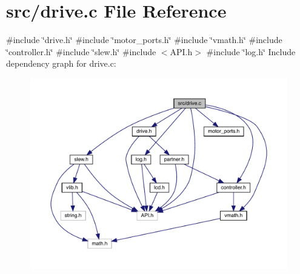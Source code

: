 \section{src/drive.c File Reference}
\label{drive_8c}
{\ttfamily \#include \char`\"{}drive.\+h\char`\"{}}\newline
{\ttfamily \#include \char`\"{}motor\+\_\+ports.\+h\char`\"{}}\newline
{\ttfamily \#include \char`\"{}vmath.\+h\char`\"{}}\newline
{\ttfamily \#include \char`\"{}controller.\+h\char`\"{}}\newline
{\ttfamily \#include \char`\"{}slew.\+h\char`\"{}}\newline
{\ttfamily \#include $<$A\+P\+I.\+h$>$}\newline
{\ttfamily \#include \char`\"{}log.\+h\char`\"{}}\newline
Include dependency graph for drive.\+c\+:
\nopagebreak
\begin{figure}[H]
\begin{center}
\leavevmode
\includegraphics[width=350pt]{drive_8c__incl}
\end{center}
\end{figure}
